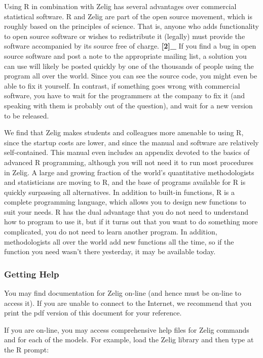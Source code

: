 \documentclass[letterpaper,10pt,english]{sphinxmanual}
\begin{document}
Using R in combination with Zelig has several advantages over commercial
statistical software. R and Zelig are part of the open source movement,
which is roughly based on the principles of science. That is, anyone who
adds functionality to open source software or wishes to redistribute it
(legally) must provide the software accompanied by its source free of
charge. {\color{red}\bfseries{}{[}2{]}\_} If you find a bug in open source software and post a note
to the appropriate mailing list, a solution you can use will likely be
posted quickly by one of the thousands of people using the program all
over the world. Since you can see the source code, you might even be
able to fix it yourself. In contrast, if something goes wrong with
commercial software, you have to wait for the programmers at the company
to fix it (and speaking with them is probably out of the question), and
wait for a new version to be released.

We find that Zelig makes students and colleagues more amenable to using
R, since the startup costs are lower, and since the manual and software
are relatively self-contained. This manual even includes an appendix
devoted to the basics of advanced R programming, although you will not
need it to run most procedures in Zelig. A large and growing fraction of
the world’s quantitative methodologists and statisticians are moving to
R, and the base of programs available for R is quickly surpassing all
alternatives. In addition to built-in functions, R is a complete
programming language, which allows you to design new functions to suit
your needs. R has the dual advantage that you do not need to understand
how to program to use it, but if it turns out that you want to do
something more complicated, you do not need to learn another program. In
addition, methodologists all over the world add new functions all the
time, so if the function you need wasn’t there yesterday, it may be
available today.


\subsubsection{Getting Help}
\label{docs/user_guide:getting-help}
You may find documentation for Zelig on-line (and hence must be on-line
to access it). If you are unable to connect to the Internet, we
recommend that you print the pdf version of this document for your
reference.

If you are on-line, you may access comprehensive help files for Zelig
commands and for each of the models. For example, load the Zelig library
and then type at the R prompt:
\end{document}
